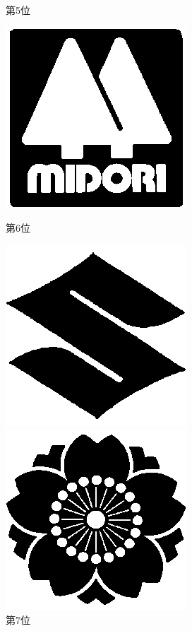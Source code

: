 \begin{figure}[htbp]
\begin{flushright}
\begin{minipage}[t]{0.16\hsize}
      \centering
      \caption{第5位}
      \label{graph:40}
    \end{minipage}
    \begin{minipage}[t]{0.16\hsize}
      \includegraphics[scale=0.3]{img/71.bmp}
      \centering
      \caption{第6位}
      \label{graph:41}
    \end{minipage}
    \begin{minipage}[t]{0.16\hsize}
      \includegraphics[scale=0.3]{img/9.bmp}
      \centering
      \caption{第7位}
      \label{graph:42}
    \end{minipage}
    \begin{minipage}[t]{0.16\hsize}
      \includegraphics[scale=0.3]{img/4.bmp}

\end{minipage}
\end{flushright}
\end{figure}
